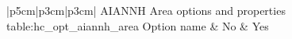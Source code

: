 \begin{customLongTable}{ |p{5cm}|p{3cm}|p{3cm}| }
{AIANNH Area options and properties} {table:hc_opt_aiannh_area}
{Option name & No & Yes}
\endhead
\hline
\end{customLongTable}

